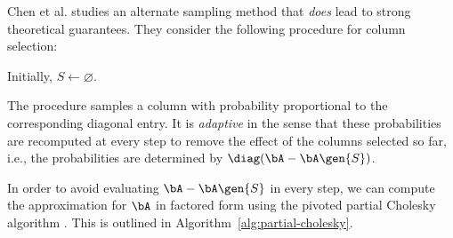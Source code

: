Chen et al. \cite{chen_randomly_2025} studies an alternate sampling method that \textit{does} lead to strong theoretical guarantees. They consider the following procedure for column selection:
\begin{algorithm}[ht]
    \label{alg:rpc-adapt}
    \DontPrintSemicolon
    \caption{Adaptive random sampling}
    Initially, $S\gets \varnothing$.\;
\end{algorithm}


The procedure samples a column with probability proportional to the corresponding diagonal entry. It is \textit{adaptive} in the sense that these probabilities are recomputed at every step to remove the effect of the columns selected so far, i.e., the probabilities are determined by $\diag(\bA - \bA\gen{S})$.

In order to avoid evaluating $\bA - \bA\gen{S}$ in every step, we can compute the approximation for $\bA$ in factored form using the pivoted partial Cholesky algorithm \cite{chen_randomly_2025}. This is outlined in Algorithm~\ref{alg:partial-cholesky}.






